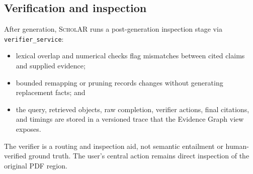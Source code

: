 \subsection{Verification and inspection}
After generation, \textsc{ScholAR} runs a post-generation inspection stage via \texttt{verifier\_service}:
\begin{itemize}[leftmargin=*,itemsep=1pt,topsep=2pt]
    \item lexical overlap and numerical checks flag mismatches between cited claims and supplied evidence;
    \item bounded remapping or pruning records changes without generating replacement facts; and
    \item the query, retrieved objects, raw completion, verifier actions, final citations, and timings are stored in a versioned trace that the Evidence Graph view exposes.
\end{itemize}
The verifier is a routing and inspection aid, not semantic entailment or human-verified ground truth. The user's central action remains direct inspection of the original PDF region.
